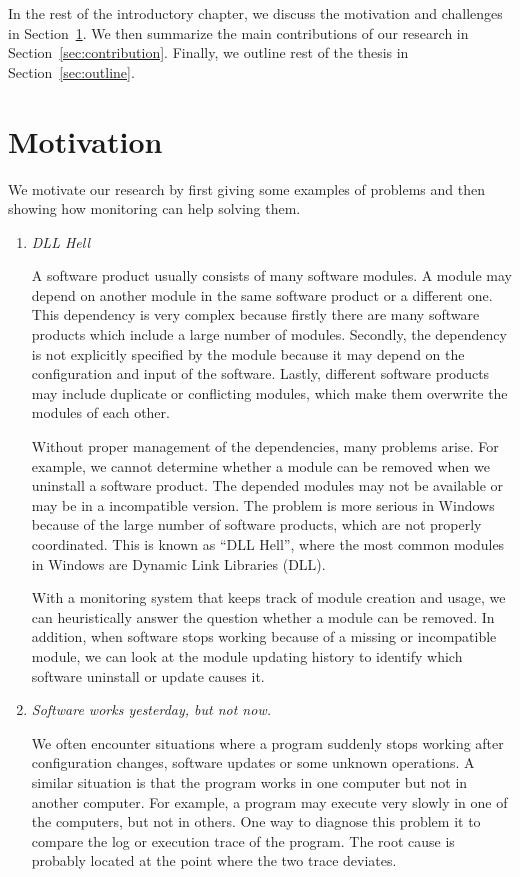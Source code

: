 In the rest of the introductory chapter,
we discuss the motivation and challenges in Section~\ref{sec:motivation}.
We then summarize the main contributions of our research in
Section~\ref{sec:contribution}.
Finally, we outline rest of the thesis in Section~\ref{sec:outline}.

\section{Motivation}
\label{sec:motivation}

We motivate our research by first giving some examples of problems and
then showing how monitoring can help solving them.

\begin{enumerate}
\item {\em DLL Hell}

A software product usually consists of many software modules.
A module may depend on another module in the same software product or
a different one.
This dependency is very complex because firstly there are many
software products which include a large number of modules.
Secondly, the dependency is not explicitly specified by the module
because it may depend on the configuration and input of the software.
Lastly, different software products may include duplicate or conflicting
modules, which make them overwrite the modules of each other.

Without proper management of the dependencies, many problems arise.
For example, we cannot determine whether a module can be removed
when we uninstall a software product.
The depended modules may not be available or may be in
a incompatible version.
The problem is more serious in Windows because of the large
number of software products, which are not properly coordinated.
This is known as ``DLL Hell'', where the most common modules
in Windows are Dynamic Link Libraries (DLL).

With a monitoring system that keeps track of module creation and usage,
we can heuristically answer the question whether a module can be removed.
In addition,
when software stops working because of a missing or incompatible module,
we can look at the module updating history to identify which software
uninstall or update causes it.

\item {\em Software works yesterday, but not now.}

We often encounter situations where a program suddenly stops working after
configuration changes, software updates or some unknown operations.
A similar situation is that the program works in one computer but not in
another computer.
For example, a program may execute very slowly in one of the computers,
but not in others.
One way to diagnose this problem it to compare the log or execution trace
of the program.
The root cause is probably located at the point where the two trace deviates.


\end{enumerate}
